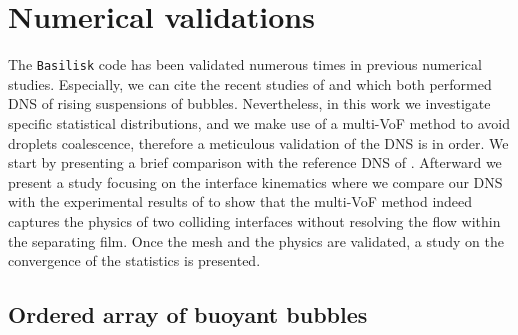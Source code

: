 \section{Numerical validations}
\label{ap:validation}
The \texttt{Basilisk} code has been validated numerous times in previous numerical studies. 
Especially, we can cite the recent studies of \citet{innocenti2020direct} and \citet{hidman2023assessing} which both performed DNS of rising suspensions of bubbles. 
Nevertheless, in this work we investigate specific statistical distributions,
and we make use of a multi-VoF method to avoid droplets coalescence, therefore a meticulous validation of the DNS is in order. 
We start by presenting a brief comparison with the reference DNS of \citet{esmaeeli1999direct}. 
Afterward we present a study focusing on the interface kinematics where we compare our DNS with the experimental results of \citet{mohamed2003drop} to show that the multi-VoF method indeed captures the physics of two colliding interfaces without resolving the flow within the separating film. 
Once the mesh and the physics are validated, a study on the convergence of the statistics is presented. 

\subsection{Ordered array of buoyant bubbles}

